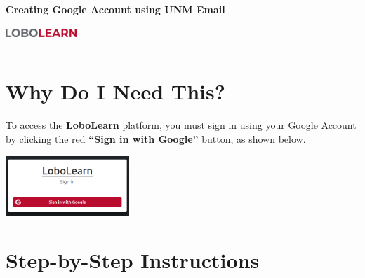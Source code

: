 \documentclass[12pt]{article}
\begin{document}
\begin{center}
    {\LARGE \bfseries \color{UNMRed}Creating Google Account using UNM Email}

    \vspace{1em}
    \includegraphics[width=0.20\textwidth]{logo_bold.png}
\end{center}

\vspace{-1em}
\noindent\rule{\linewidth}{1pt}

\section*{Why Do I Need This?}
To access the \textbf{LoboLearn} platform, you must sign in using your Google Account by clicking the red \textbf{“Sign in with Google”} button, as shown below.

\begin{center}
    \includegraphics[width=0.35\textwidth]{sign-in-button.png}  %
\end{center}

\section*{Step-by-Step Instructions}
\end{document}
